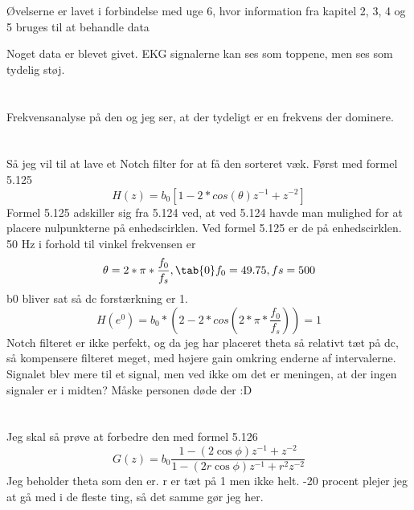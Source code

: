 \begin{Øvelser}
\begin{kapitel}[Z domænet]
\begin{Øvelse}
        \end{Øvelse}
    \end{kapitel}
    \begin{kapitel}[Fourier]
    \end{kapitel}
    \begin{kapitel}
        Øvelserne er lavet i forbindelse med uge 6, hvor information fra kapitel 2, 3, 4 og 5 bruges til at behandle data
        \begin{Øvelse}
            Noget data er blevet givet. EKG signalerne kan ses som toppene, men ses som tydelig støj.
            \\\\\\

            Frekvensanalyse på den og jeg ser, at der tydeligt er en frekvens der dominere. 
            \\\\\\
            Så jeg vil til at lave et Notch filter for at få den sorteret væk. Først med formel 5.125
            \[H(z) = b_0[1 - 2*cos(\theta)z^{-1} + z^{-2}]\]
            Formel 5.125 adskiller sig fra 5.124 ved, at ved 5.124 havde man mulighed for at placere nulpunkterne på enhedscirklen. 
            Ved formel 5.125 er de på enhedscirklen. 
            50 Hz i forhold til vinkel frekvensen er 
            \[\theta = 2 * \pi * \frac{f_0}{f_s}, \tab{0} f_0 = 49.75, fs = 500\]
            b0 bliver sat så dc forstærkning er 1. 
            \[H(e^0) = b_0 * (2 - 2*cos(2 * \pi * \frac{f_0}{f_s})) = 1\] 
            \clearpage
            Notch filteret er ikke perfekt, og da jeg har placeret theta så relativt tæt på dc, så kompensere filteret meget, med højere gain omkring enderne af intervalerne.
            \clearpage
            Signalet blev mere til et signal, men ved ikke om det er meningen, at der ingen signaler er i midten? Måske personen døde der :D 
            \\\\\\
            Jeg skal så prøve at forbedre den med formel 5.126
            \[G(z)=b_0 \frac{1-(2\cos\phi)z^{-1}+z^{-2}}{1-(2r\cos\phi)z^{-1}+r^{2}z^{-2}}\]
            Jeg beholder theta som den er. 
            r er tæt på 1 men ikke helt. -20 procent plejer jeg at gå med i de fleste ting, så det samme gør jeg her. 

\end{Øvelse}
\end{kapitel}
\end{Øvelser}
